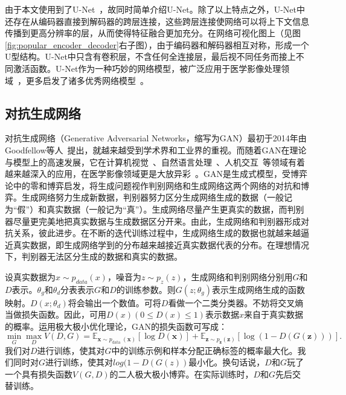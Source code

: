 由于本文使用到了U-Net~\cite{ronneberger2015u}，故同时简单介绍U-Net。除了以上特点之外，U-Net中还存在从编码器直接到解码器的跨层连接，这些跨层连接使网络可以将上下文信息传播到更高分辨率的层，从而使得特征融合更加充分。在网络可视化图上（见图\ref{fig:popular_encoder_decoder}右子图），由于编码器和解码器相互对称，形成一个U型结构。U-Net中只含有卷积层，不含任何全连接层，最后视不同任务而接上不同激活函数。U-Net作为一种巧妙的网络模型，被广泛应用于医学影像处理领域~\cite{cciccek20163d, han2018framing, dong2017automatic, sevastopolsky2017optic, zhang2018ct}，更多启发了诸多优秀网络模型~\cite{zhou2018unet++, oktay2018attention, ibtehaz2020multiresunet, alom2019recurrent, milletari2016v}。
\subsection{对抗生成网络}\label{subsec:gan_introduction}
对抗生成网络（Generative Adversarial Networks，缩写为GAN）最初于2014年由Goodfellow等人~\cite{goodfellow2014generative}提出，就越来越受到学术界和工业界的重视。而随着GAN在理论与模型上的高速发展，它在计算机视觉~\cite{zhu2017unpaired, isola2017image}、自然语言处理~\cite{qin2018dsgan, guimaraes2017objective}、人机交互~\cite{qiao2018emotional, sahu2018enhancing}等领域有着越来越深入的应用，在医学影像领域更是大放异彩~\cite{yang2017dagan, yang2018low, shin2018medical, onishi2020multiplanar, bhadra2020medical}。GAN是生成式模型，受博弈论中的零和博弈启发，将生成问题视作判别网络和生成网络这两个网络的对抗和博弈。生成网络努力生成新数据，判别器努力区分生成网络生成的数据（一般记为“假”）和真实数据（一般记为“真”）。生成网络尽量产生更真实的数据，而判别器尽量更完美地把真实数据与生成数据区分开来。由此，生成网络和判别器形成对抗关系，彼此进步。在不断的迭代训练过程中，生成网络生成的数据也就越来越逼近真实数据，即生成网络学到的分布越来越接近真实数据代表的分布。在理想情况下，判别器无法区分生成的数据和真实的数据。

设真实数据为$x\sim p_{data}(x)$，噪音为$z\sim p_z(z)$，生成网络和判别网络分别用$G$和$D$表示。$\theta_{g}$和$\theta_{d}$分表表示$G$和$D$的训练参数。则$G(z;\theta_{g})$表示生成网络生成的函数映射。$D(x;\theta_{d})$将会输出一个数值。可将$D$看做一个二类分类器。不妨将交叉熵当做损失函数。因此，可用$D(x)(0\leq D(x)\leq 1)$表示数据$x$来自于真实数据的概率。运用极大极小优化理论，GAN的损失函数可写成：
\begin{equation}\label{equ:gan_loss_func}
\min _{G} \max _{D} V(D, G)=\mathbb{E}_{\boldsymbol{x} \sim p_{\text {data }}(\boldsymbol{x})}[\log D(\boldsymbol{x})]+\mathbb{E}_{\boldsymbol{z} \sim p_{\boldsymbol{z}}(\boldsymbol{z})}[\log (1-D(G(\boldsymbol{z})))].
\end{equation}
我们对$D$进行训练，使其对$G$中的训练示例和样本分配正确标签的概率最大化。我们同时对$G$进行训练，使其对$log(1 - D(G(z))$最小化。换句话说，$D$和$G$玩了一个具有损失函数$V (G, D)$的二人极大极小博弈。在实际训练时，$D$和$G$先后交替训练。

